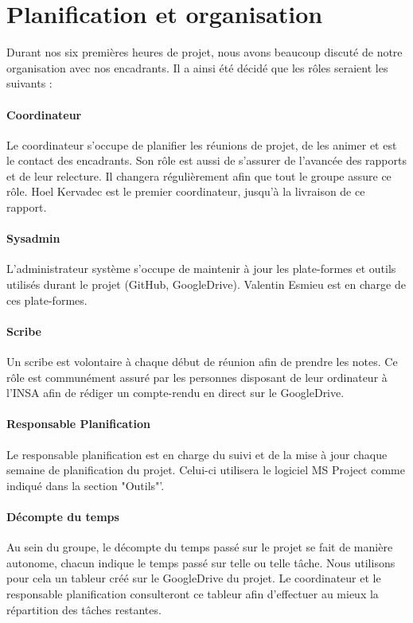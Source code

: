 \section{Planification et organisation}
	Durant nos six premières heures de projet, nous avons beaucoup discuté de notre organisation avec nos encadrants. Il a ainsi été décidé que les rôles seraient les suivants :
	\paragraph{Coordinateur} Le coordinateur s'occupe de planifier les réunions de projet, de les animer et est le contact des encadrants. Son rôle est aussi de s'assurer de l'avancée des rapports et de leur relecture. Il changera régulièrement afin que tout le groupe assure ce rôle. Hoel Kervadec est le premier coordinateur, jusqu'à la livraison de ce rapport.
	\paragraph{Sysadmin} L'administrateur système s'occupe de maintenir à jour les plate-formes et outils utilisés durant le projet (GitHub, GoogleDrive). Valentin Esmieu est en charge de ces plate-formes.
	\paragraph{Scribe} Un scribe est volontaire à chaque début de réunion afin de prendre les notes. Ce rôle est communément assuré par les personnes disposant de leur ordinateur à l'INSA afin de rédiger un compte-rendu en direct sur le GoogleDrive.
	\paragraph{Responsable Planification} Le responsable planification est en charge du suivi et de la mise à jour chaque semaine de planification du projet. Celui-ci utilisera le logiciel MS Project comme indiqué dans la section "Outils"'.
	\paragraph{Décompte du temps} Au sein du groupe, le décompte du temps passé sur le projet se fait de manière autonome, chacun indique le temps passé sur telle ou telle tâche. Nous utilisons pour cela un tableur créé sur le GoogleDrive du projet. Le coordinateur et le responsable planification consulteront ce tableur afin d'effectuer au mieux la répartition des tâches restantes.

